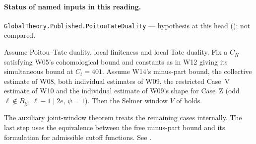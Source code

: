 

\paragraph{Status of named inputs in this reading.}
\noindent\nolinkurl{GlobalTheory.Published.PoitouTateDuality} --- hypothesis at this head (); not compared.\par

\begin{formalstatement}\label{sub:W13}
Assume Poitou--Tate duality, local finiteness and local Tate duality.
Fix a $C_K$ satisfying W05's cohomological bound and constants as
in W12 giving its simultaneous bound at $C_t=401$. Assume W14's
minus-part bound, the collective estimate of W08, both individual
estimates of W09, the restricted Case~V estimate of W10 and the
individual estimate of W09's shape for Case~Z (odd
$\ell\notin B_\chi$, $\ell-1\mid2e$, $\psi=1$).
Then the Selmer window $V$ of  holds.
\end{formalstatement}
The auxiliary joint-window theorem treats the remaining cases internally.
The last step uses the equivalence between the free minus-part bound and
its formulation for admissible cutoff functions. See .
